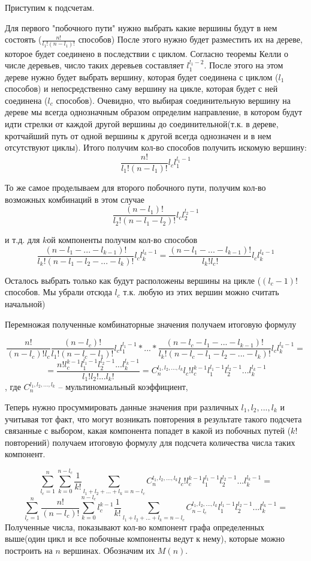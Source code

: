 \documentclass[10pt, a4paper]{report}
\begin{document}
Приступим к подсчетам.

Для первого "побочного пути" нужно выбрать какие вершины  будут в нем состоять ($\frac{n!}{l_1!(n - l_1)!}$ способов) После этого нужно будет разместить их на дереве, которое будет соединено в последствии с циклом. Согласно теоремы Келли о числе деревьев, число таких деревьев составляет $l_1^{l_1-2}$. После этого на этом дереве нужно будет выбрать вершину, которая будет соединена с циклом ($l_1$ способов) и непосредственно саму вершину на цикле, которая будет с ней соединена ($l_c$ способов). Очевидно, что выбирая соединительную вершину на дереве мы всегда однозначным образом определим направление, в котором будут идти стрелки от каждой другой вершины до соединительной(т.к. в дереве, кротчайший путь от одной вершины к другой всегда однозначен и в нем отсутствуют циклы). Итого получим кол-во способов получить искомую вершину:
$$\frac{n!}{l_1!(n- l_1)!}l_c l_1^{l_1-1}$$


То же самое проделываем для второго побочного пути, получим кол-во возможных комбинаций в этом случае  
$$\frac{(n- l_1)!}{l_2!(n- l_1 - l_2)!}l_c l_2^{l_2-1}$$


 и т.д. для $k$ой компоненты получим кол-во способов
$$
\frac{(n - l_1 - ... -l_{k-1})!}{l_k!(n - l_1 - l_2 - ... - l_k)!}l_c l_k^{l_k-1}=
\frac{(n - l_1 - ... -l_{k-1})!}{l_k!l_c!}l_c l_k^{l_k-1}
$$

Осталось выбрать только как будут расположены вершины на цикле ($(l_c-1)!$ способов. Мы убрали отсюда $l_c$ т.к. любую из этих вершин можно считать начальной)

Перемножая полученные комбинаторные значения получаем итоговую формулу

$$
\frac{n!}{(n - l_c)! l_c} \frac{(n- l_c)!}{l_1!(n - l_c - l_1)!}l_c l_1^{l_1-1} * ... * \frac{(n - l_c - l_1 - ... -l_{k-1})!}{l_k!(n - l_c - l_1 - l_2 - ... - l_k)!} l_c l_k^{l_k-1}=
$$
$$
= \frac{n!l_c^{k-1}l_1^{l_1-1}l_2^{l_2-1}...l_k^{l_k-1}}{l_1!l_2!...l_k!}=
C^{l_1, l_2, ..., l_k}_n l_c! l_c^{k-1}l_1^{l_1-1}l_2^{l_2-1}...l_k^{l_k-1}
$$
, где $C^{l_1, l_2, ..., l_k}_n$ -- мультиномиальный коэффициент,

Теперь нужно просуммировать данные значения при различных $l_1, l_2, ..., l_k$ и учитывая тот факт, что могут возникать повторения в результате такого подсчета связанные с выбором, какая компонента попадет в какой из побочных путей ($k!$ повторений) получаем итоговую формулу для подсчета количества числа таких компонент.

$$
\sum_{l_c=1}^n \sum_{k=0}^{n-l_c}\frac 1 {k!}\sum_{l_1+l_2+...+l_k=n-l_c} C^{l_1, l_2, ..., l_k}_n l_c! l_c^{k-1}l_1^{l_1-1}l_2^{l_2-1}...l_k^{l_k-1}=
$$
$$
\sum_{l_c=1}^n \frac {n!}{(n-l_c)!} \sum_{k=0}^{n-l_c} l_c^{k-1} \frac 1 {k!}\sum_{l_1+l_2+...+l_k=n-l_c} C^{l_1, l_2, ..., l_k}_{n-l_c} l_1^{l_1-1}l_2^{l_2-1}...l_k^{l_k-1}=
$$
Полученные числа, показывают кол-во компонент графа определенных выше(один цикл и все побочные компоненты ведут к нему), которые можно построить на $n$ вершинах. Обозначим их $M(n)$.
\end{document}
